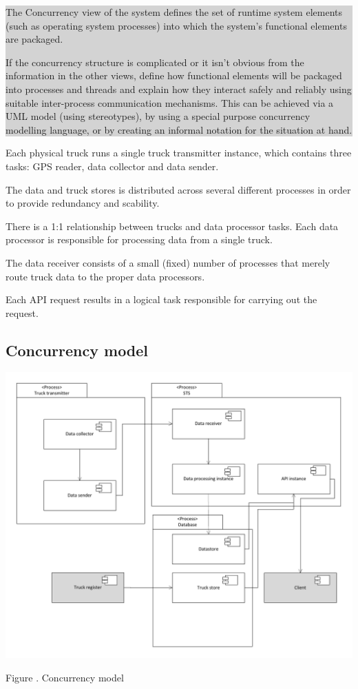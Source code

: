 \documentclass[a4paper,11pt]{report}
\newcommand{\instructions}[1]{
  \noindent\colorbox{lightgray}{%
    \parbox{\linewidth}{%
      #1
    }%
  }%
 \vspace{0.1cm}
}
\newcommand{\mycaption}[1]{
  \addtocounter{figures}{1}
  Figure \arabic{figures}. #1
}
\begin{document}
\instructions{
The Concurrency view of the system defines the set of runtime system
elements (such as operating system processes) into which the system’s
functional elements are packaged.

If the concurrency structure is complicated or it isn’t obvious from
the information in the other views, define how functional elements
will be packaged into processes and threads and explain how they
interact safely and reliably using suitable inter-process
communication mechanisms. This can be achieved via a UML model (using
stereotypes), by using a special purpose concurrency modelling
language, or by creating an informal notation for the situation at
hand.
}

Each physical truck runs a single truck transmitter instance, which
contains three tasks: GPS reader, data collector and data sender.

The data and truck stores is distributed across several different
processes in order to provide redundancy and scability.

There is a 1:1 relationship between trucks and data processor tasks.
Each data processor is responsible for processing data from a single
truck.

The data receiver consists of a small (fixed) number of processes that
merely route truck data to the proper data processors.

Each API request results in a logical task responsible for carrying
out the request.

\subsection{Concurrency model}
\label{sec:concurrency-model}

\begin{center}
  \includegraphics[width=\textwidth]{figures/concurrency_model}\\
  \mycaption{Concurrency model}
\end{center}
\end{document}
